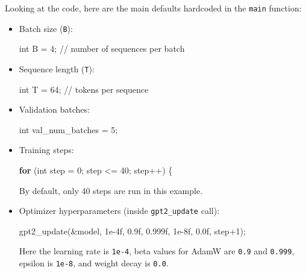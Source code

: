 \documentclass[
  letterpaper,
  DIV=11,
  numbers=noendperiod]{scrreprt}
\newenvironment{Shaded}{\begin{snugshade}}{\end{snugshade}}
\newcommand{\BuiltInTok}[1]{\textcolor[rgb]{0.00,0.23,0.31}{#1}}
\newcommand{\CommentTok}[1]{\textcolor[rgb]{0.37,0.37,0.37}{#1}}
\newcommand{\ControlFlowTok}[1]{\textcolor[rgb]{0.00,0.23,0.31}{\textbf{#1}}}
\newcommand{\DataTypeTok}[1]{\textcolor[rgb]{0.68,0.00,0.00}{#1}}
\newcommand{\DecValTok}[1]{\textcolor[rgb]{0.68,0.00,0.00}{#1}}
\newcommand{\FloatTok}[1]{\textcolor[rgb]{0.68,0.00,0.00}{#1}}
\newcommand{\NormalTok}[1]{\textcolor[rgb]{0.00,0.23,0.31}{#1}}
\newcommand{\OperatorTok}[1]{\textcolor[rgb]{0.37,0.37,0.37}{#1}}
\begin{document}
Looking at the code, here are the main defaults hardcoded in the
\texttt{main} function:

\begin{itemize}
\item
  Batch size (\texttt{B}):

\begin{Shaded}
\begin{Highlighting}[]
\DataTypeTok{int}\NormalTok{ B }\OperatorTok{=} \DecValTok{4}\OperatorTok{;} \CommentTok{// number of sequences per batch}
\end{Highlighting}
\end{Shaded}
\item
  Sequence length (\texttt{T}):

\begin{Shaded}
\begin{Highlighting}[]
\DataTypeTok{int}\NormalTok{ T }\OperatorTok{=} \DecValTok{64}\OperatorTok{;} \CommentTok{// tokens per sequence}
\end{Highlighting}
\end{Shaded}
\item
  Validation batches:

\begin{Shaded}
\begin{Highlighting}[]
\DataTypeTok{int}\NormalTok{ val\_num\_batches }\OperatorTok{=} \DecValTok{5}\OperatorTok{;}
\end{Highlighting}
\end{Shaded}
\item
  Training steps:

\begin{Shaded}
\begin{Highlighting}[]
\ControlFlowTok{for} \OperatorTok{(}\DataTypeTok{int}\NormalTok{ step }\OperatorTok{=} \DecValTok{0}\OperatorTok{;}\NormalTok{ step }\OperatorTok{\textless{}=} \DecValTok{40}\OperatorTok{;}\NormalTok{ step}\OperatorTok{++)} \OperatorTok{\{}
\end{Highlighting}
\end{Shaded}

  By default, only 40 steps are run in this example.
\item
  Optimizer hyperparameters (inside \texttt{gpt2\_update} call):

\begin{Shaded}
\begin{Highlighting}[]
\NormalTok{gpt2\_update}\OperatorTok{(\&}\NormalTok{model}\OperatorTok{,} \FloatTok{1e{-}4}\BuiltInTok{f}\OperatorTok{,} \FloatTok{0.9}\BuiltInTok{f}\OperatorTok{,} \FloatTok{0.999}\BuiltInTok{f}\OperatorTok{,} \FloatTok{1e{-}8}\BuiltInTok{f}\OperatorTok{,} \FloatTok{0.0}\BuiltInTok{f}\OperatorTok{,}\NormalTok{ step}\OperatorTok{+}\DecValTok{1}\OperatorTok{);}
\end{Highlighting}
\end{Shaded}

  Here the learning rate is \texttt{1e-4}, beta values for AdamW are
  \texttt{0.9} and \texttt{0.999}, epsilon is \texttt{1e-8}, and weight
  decay is \texttt{0.0}.
\end{itemize}
\end{document}
